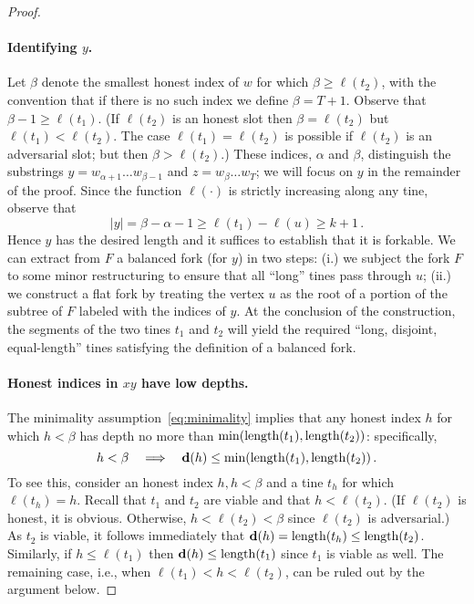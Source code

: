 \begin{proof}
    \paragraph{Identifying $y$.}
    Let $\beta$ denote the smallest honest index of $w$ for which
    $\beta \geq \ell(t_2)$, with the convention that if there is no such
    index we define $\beta = T + 1$. 
    Observe that $\beta - 1 \geq \ell(t_1)$. 
    (If $\ell(t_2)$ is an honest slot then $\beta = \ell(t_2)$ 
    but $\ell(t_1) < \ell(t_2)$. 
    The case $\ell(t_1) = \ell(t_2)$ is possible if $\ell(t_2)$ is an adversarial slot; 
    but then $\beta > \ell(t_2)$.)
    These indices, $\alpha$ and $\beta$, distinguish the
    substrings $y = w_{\alpha+1} \ldots w_{\beta-1}$ and 
    $z = w_{\beta} \ldots w_T$; 
    we will focus on $y$ in the remainder of the proof. 
    Since the function
    $\ell(\cdot)$ is strictly increasing along any tine, observe that
    \begin{equation*}
        |y| 
        = \beta - \alpha - 1 
        \geq \ell(t_1) - \ell(u) 
        \geq k + 1
        \,.
    \end{equation*}
    Hence $y$ has the desired length and it suffices to establish that it is forkable.
    We can extract from $F$ a balanced fork (for $y$) in
    two steps: (i.) we subject the fork $F$ to some minor
    restructuring to ensure that all ``long'' tines pass through $u$;
    (ii.) we construct a flat fork by treating the vertex $u$ as the
    root of a portion of the subtree of $F$ labeled with the indices of
    $y$. At the conclusion of the construction, the segments of the
    two tines $t_1$ and $t_2$ will yield the required ``long, disjoint, equal-length''
    tines satisfying the definition of a balanced fork.

    
    \paragraph{Honest indices in $xy$ have low depths.}
    The minimality assumption~\eqref{eq:minimality} implies that any honest
    index $h$ for which $h < \beta$ has depth no more than
    $\min(\operatorname{length}(t_1),\operatorname{length}(t_2))$: specifically,
    \begin{equation}\label{eq:honest-depth}
      h < \beta \quad\Longrightarrow \quad \mathbf{d}(h) \leq \min(\operatorname{length}(t_1), \operatorname{length}(t_2))\,.
    \end{equation}
    To see this, consider an honest index $h,h < \beta$ and a tine $t_h$
    for which $\ell(t_h) = h$. Recall that $t_1$ and $t_2$ are viable and 
    that $h < \ell(t_2)$. (If $\ell(t_2)$ is honest, it is obvious. 
    Otherwise, $h < \ell(t_2) < \beta$ since $\ell(t_2)$ is adversarial.) 
    As $t_2$ is viable, it follows immediately that
    $\mathbf{d}(h)  = \operatorname{length}(t_h) \leq \operatorname{length}(t_2)$. 
    Similarly, if $h \leq \ell(t_1)$
    then $\mathbf{d}(h) \leq \operatorname{length}(t_1)$ since $t_1$ is viable as well. 
    The remaining case, i.e., when $\ell(t_1) < h < \ell(t_2)$, can be ruled out 
    by the argument below.


\end{proof}
